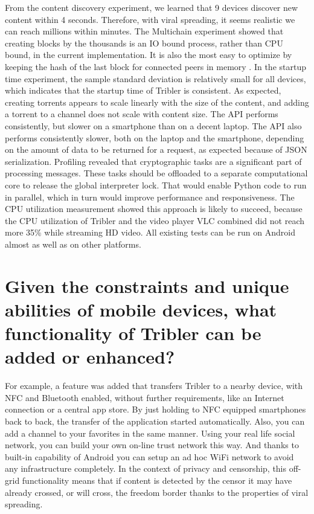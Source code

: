 From the content discovery experiment, we learned that 9 devices discover new content within 4 seconds.
Therefore, with viral spreading, it seems realistic we can reach millions within minutes.
The Multichain experiment showed that creating blocks by the thousands is an IO bound process, rather than CPU bound, in the current implementation.
It is also the most easy to optimize by keeping the hash of the last block for connected peers in memory .
In the startup time experiment, the sample standard deviation is relatively small for all devices, which indicates that the startup time of Tribler is consistent.
As expected, creating torrents appears to scale linearly with the size of the content, and adding a torrent to a channel does not scale with content size.
The API performs consistently, but slower on a smartphone than on a decent laptop.
The API also performs consistently slower, both on the laptop and the smartphone, depending on the amount of data to be returned for a request, as expected because of JSON serialization.
Profiling revealed that cryptographic tasks are a significant part of processing messages.
These tasks should be offloaded to a separate computational core to release the global interpreter lock.
That would enable Python code to run in parallel, which in turn would improve performance and responsiveness.
The CPU utilization measurement showed this approach is likely to succeed, because the CPU utilization of Tribler and the video player VLC combined did not reach more 35\% while streaming HD video.
All existing tests can be run on Android almost as well as on other platforms.







\section{Given the constraints and unique abilities of mobile devices, what functionality of Tribler can be added or enhanced?}

For example, a feature was added that transfers Tribler to a nearby device, with NFC and Bluetooth enabled, without further requirements, like an Internet connection or a central app store.
By just holding to NFC equipped smartphones back to back, the transfer of the application started automatically.
Also, you can add a channel to your favorites in the same manner.
Using your real life social network, you can build your own on-line trust network this way.
And thanks to built-in capability of Android you can setup an ad hoc WiFi network to avoid any infrastructure completely.
In the context of privacy and censorship, this off-grid functionality means that if content is detected by the censor it may have already crossed, or will cross, the freedom border thanks to the properties of viral spreading.

